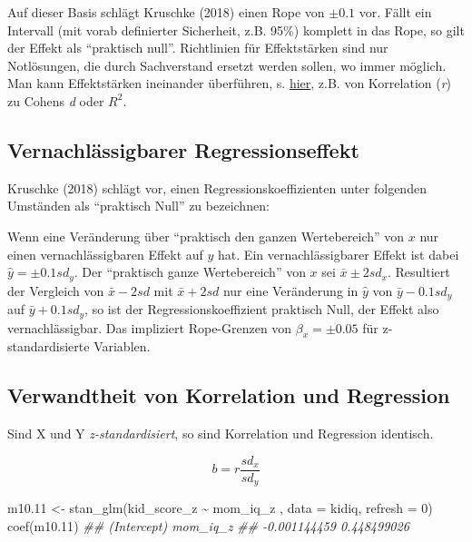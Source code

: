 \documentclass[
  a4paper,
  DIV=11]{scrreprt}
\newenvironment{Shaded}{\begin{snugshade}}{\end{snugshade}}
\newcommand{\AttributeTok}[1]{\textcolor[rgb]{0.40,0.45,0.13}{#1}}
\newcommand{\DecValTok}[1]{\textcolor[rgb]{0.68,0.00,0.00}{#1}}
\newcommand{\DocumentationTok}[1]{\textcolor[rgb]{0.37,0.37,0.37}{\textit{#1}}}
\newcommand{\FloatTok}[1]{\textcolor[rgb]{0.68,0.00,0.00}{#1}}
\newcommand{\FunctionTok}[1]{\textcolor[rgb]{0.28,0.35,0.67}{#1}}
\newcommand{\NormalTok}[1]{\textcolor[rgb]{0.00,0.23,0.31}{#1}}
\newcommand{\OtherTok}[1]{\textcolor[rgb]{0.00,0.23,0.31}{#1}}
\newcommand{\SpecialCharTok}[1]{\textcolor[rgb]{0.37,0.37,0.37}{#1}}
\theoremstyle{definition}
\theoremstyle{remark}
\begin{document}
Auf dieser Basis schlägt Kruschke (2018) einen Rope von \(\pm0.1\) vor.
Fällt ein Intervall (mit vorab definierter Sicherheit, z.B. 95\%)
komplett in das Rope, so gilt der Effekt als ``praktisch null''.
Richtlinien für Effektstärken sind nur Notlösungen, die durch
Sachverstand ersetzt werden sollen, wo immer möglich. Man kann
Effektstärken ineinander überführen, s.
\href{https://www.escal.site/}{hier}, z.B. von Korrelation (\emph{r}) zu
Cohens \emph{d} oder \(R^2\).

\hypertarget{vernachluxe4ssigbarer-regressionseffekt}{%
\subsection{Vernachlässigbarer
Regressionseffekt}\label{vernachluxe4ssigbarer-regressionseffekt}}

Kruschke (2018) schlägt vor, einen Regressionskoeffizienten unter
folgenden Umständen als ``praktisch Null'' zu bezeichnen:

Wenn eine Veränderung über ``praktisch den ganzen Wertebereich'' von
\(x\) nur einen vernachlässigbaren Effekt auf \(y\) hat. Ein
vernachlässigbarer Effekt ist dabei \(\hat{y}= \pm 0.1 sd_y\). Der
``praktisch ganze Wertebereich'' von \(x\) sei \(\bar{x} \pm 2 sd_x\).
Resultiert der Vergleich von \(\bar{x} -2 sd\) mit \(\bar{x}+2sd\) nur
eine Veränderung in \(\hat{y}\) von \(\bar{y} - 0.1sd_y\) auf
\(\bar{y} + 0.1 sd_y\), so ist der Regressionskoeffizient praktisch
Null, der Effekt also vernachlässigbar. Das impliziert Rope-Grenzen von
\(\beta_x = \pm 0.05\) für z-standardisierte Variablen.

\hypertarget{verwandtheit-von-korrelation-und-regression}{%
\subsection{Verwandtheit von Korrelation und
Regression}\label{verwandtheit-von-korrelation-und-regression}}

Sind X und Y \emph{z-standardisiert}, so sind Korrelation und Regression
identisch.

\[b = r \frac{sd_x}{sd_y}\]

\begin{Shaded}
\begin{Highlighting}[]
\NormalTok{m10}\FloatTok{.11} \OtherTok{\textless{}{-}} 
  \FunctionTok{stan\_glm}\NormalTok{(kid\_score\_z }\SpecialCharTok{\textasciitilde{}}\NormalTok{ mom\_iq\_z , }\AttributeTok{data =}\NormalTok{ kidiq, }\AttributeTok{refresh =} \DecValTok{0}\NormalTok{)}
\FunctionTok{coef}\NormalTok{(m10}\FloatTok{.11}\NormalTok{)}
\DocumentationTok{\#\#  (Intercept)     mom\_iq\_z }
\DocumentationTok{\#\# {-}0.001144459  0.448499026}
\end{Highlighting}
\end{Shaded}
\end{document}
